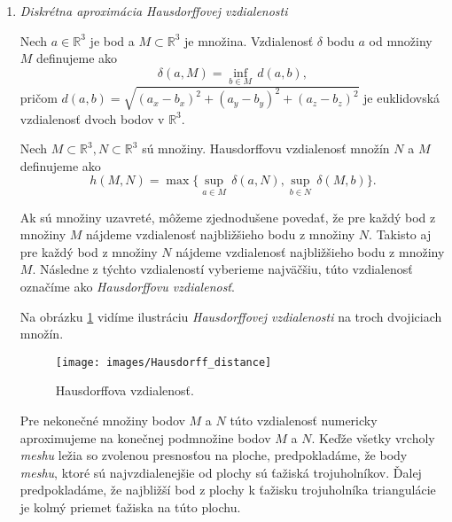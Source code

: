 \begin{enumerate}
{    Odmeriame priemerný pomer najväčšej a najmenšej strany a budeme sledovať, či sa pri 
    zmenšujúcej dĺžke $a$ zmenšuje, resp. blíži zhora k $1$.

    Kritérium budeme označovať $k_3$.
}
\item{
    \textit{Diskrétna aproximácia Hausdorffovej vzdialenosti}

    \begin{definition}
        Nech $a \in \mathbb{R}^3$ je bod a $M \subset \mathbb{R}^3$ je množina.
        Vzdialenosť $\delta$ bodu $a$ od množiny $M$ definujeme ako
        \begin{equation}
            \delta(a, M) = \inf_{b \in M} \, d(a, b),
        \end{equation}
        pričom $d(a, b) = \sqrt{(a_x-b_x)^2 + (a_y-b_y)^2 + (a_z-b_z)^2}$ je euklidovská 
        vzdialenosť dvoch bodov v $\mathbb{R}^3$.
    \end{definition}

    \begin{definition}
        Nech $M \subset \mathbb{R}^3, N \subset \mathbb{R}^3$ sú množiny.
        Hausdorffovu vzdialenosť množín $N$ a $M$ definujeme ako
        \begin{equation}
            h(M, N) = \max \big \{\sup_{a \in M} \, \delta(a, N), \sup_{b \in N} \, \delta(M, b) \big \}.
        \end{equation}
    \end{definition}

    Ak sú množiny uzavreté, môžeme zjednodušene povedať, že pre každý bod z množiny $M$ nájdeme 
    vzdialenosť najbližšieho bodu z množiny $N$.
    Takisto aj pre každý bod z množiny $N$ nájdeme vzdialenosť najbližšieho bodu z množiny $M$.
    Následne z týchto vzdialeností vyberieme najväčšiu, túto vzdialenosť označíme ako 
    \textit{Hausdorffovu vzdialenosť}.

    Na obrázku \ref{obr:hausdorff_distance} vidíme ilustráciu \textit{Hausdorffovej vzdialenosti} 
    na troch dvojiciach množín.

    \begin{figure}
        \centerline{\texttt{[image: images/Hausdorff\_distance]}}
        \caption[Hausdorffova vzdialenosť]{Hausdorffova vzdialenosť.}
        \label{obr:hausdorff_distance}
    \end{figure}


    Pre nekonečné množiny bodov $M$ a $N$ túto vzdialenosť numericky aproximujeme na konečnej 
    podmnožine bodov $M$ a $N$. Keďže všetky vrcholy \textit{meshu} ležia so zvolenou presnosťou na ploche, 
    predpokladáme, že body \textit{meshu}, ktoré sú najvzdialenejšie od plochy sú ťažiská trojuholníkov.
    Ďalej predpokladáme, že najbližší bod z plochy k ťažisku trojuholníka triangulácie
    je kolmý priemet ťažiska na túto plochu.

}
\end{enumerate}
